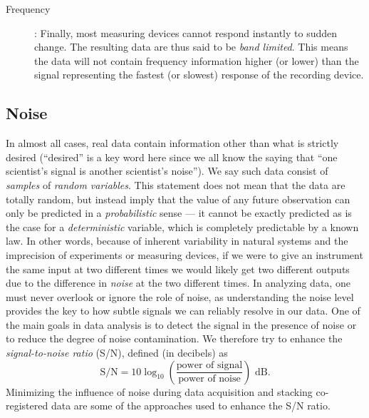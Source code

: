 \begin{description}
\item [Frequency]: Finally, most measuring devices cannot respond instantly to 
sudden change.  The resulting data are thus said to be \emph{band limited}.  This means the data will not 
contain frequency information higher (or lower) than the signal representing the fastest (or slowest) response of the 
recording device.
\end{description}

\subsection{Noise}
	In almost all cases, real data contain information 
other than what is strictly desired (``desired'' is a key word here since we all know the saying that 
``one scientist's signal is another scientist's noise'').  We say such data consist of \emph{samples} of
\emph{random variables}.  This statement does not mean that the data are totally random, but instead imply that the value of any 
future observation can only be predicted in a \emph{probabilistic} sense --- it cannot be exactly predicted 
as is the case for a \emph{deterministic} variable, which is completely predictable by a known law.  In 
other words, because of inherent variability in natural systems and the imprecision of experiments or 
measuring devices, if we were to give an instrument the same input at two different times we 
would likely get two different outputs due to the difference in \emph{noise} at the two different times.  In analyzing data, one must 
never overlook or ignore the role of noise, as understanding the noise level provides the key to how subtle signals we
can reliably resolve in our data.
	One of the main goals in data analysis is to detect the signal in the presence of noise or to reduce 
the degree of noise contamination.  We therefore try to enhance the \emph{signal-to-noise ratio} (S/N), 
defined (in decibels) as
\begin{equation}
	\mbox{S/N} = 10 \log _{10} \left (\frac{\mbox{power of signal}}{\mbox{power of noise}}\right ) \mbox{ dB}.
\end{equation}
Minimizing the influence of noise during data acquisition and stacking co-registered data are some of the
approaches used to enhance the S/N ratio.
